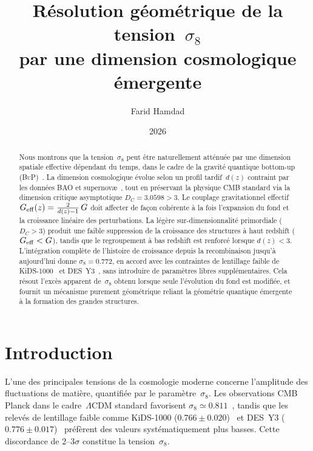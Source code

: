 \documentclass[11pt]{article}
\title{
  \textbf{Résolution géométrique de la tension~$\sigma_8$\\
  par une dimension cosmologique émergente}
}
\author{Farid Hamdad}
\affil{
  Cadre Bottom-Up Quantum Gravity (\BuP)\\
  \small\url{https://github.com/Farid-Hamdad/Bottom-up-Quantum-Gravity}
}
\date{2026}
\newcommand{\DC}{D_C}
\newcommand{\Geff}{G_{\rm eff}}
\newcommand{\sig}{\sigma_8}
\newcommand{\LCDM}{\Lambda\mathrm{CDM}}
\newcommand{\BuP}{\textsc{BuP}}
\begin{document}
\maketitle

\begin{abstract}
Nous montrons que la tension~$\sig$ peut être naturellement atténuée
par une dimension spatiale effective dépendant du temps, dans le cadre
de la gravité quantique bottom-up (\BuP)~\cite{hamdad2026bup}.
La dimension cosmologique évolue selon un profil tardif~$d(z)$
contraint par les données BAO et supernovæ~\cite{desi2024,pantheon},
tout en préservant la physique CMB standard via la dimension critique
asymptotique $\DC = 3.0598 > 3$.
Le couplage gravitationnel effectif
$\Geff(z) = \frac{2}{d(z)-1}\,G$
doit affecter de façon cohérente à la fois l'expansion du fond
et la croissance linéaire des perturbations.
La légère sur-dimensionnalité primordiale ($\DC > 3$) produit une
faible suppression de la croissance des structures à haut redshift
($\Geff < G$), tandis que le regroupement à bas redshift est renforcé
lorsque $d(z) < 3$.
L'intégration complète de l'histoire de croissance depuis la
recombinaison jusqu'à aujourd'hui donne
$\sig = 0.772$,
en accord avec les contraintes de lentillage faible de KiDS-1000~\cite{kids2021}
et DES~Y3~\cite{des2022}, sans introduire de paramètres libres
supplémentaires.
Cela résout l'excès apparent de~$\sig$ obtenu lorsque seule l'évolution
du fond est modifiée, et fournit un mécanisme purement géométrique reliant
la géométrie quantique émergente à la formation des grandes structures.
\end{abstract}

\section{Introduction}

L'une des principales tensions de la cosmologie moderne concerne
l'amplitude des fluctuations de matière, quantifiée par le
paramètre~$\sig$.
Les observations CMB Planck dans le cadre~$\LCDM$ standard
favorisent $\sig \simeq 0.811$~\cite{planck2018}, tandis que les
relevés de lentillage faible comme KiDS-1000
($0.766 \pm 0.020$)~\cite{kids2021} et DES~Y3
($0.776 \pm 0.017$)~\cite{des2022} préfèrent des valeurs
systématiquement plus basses.
Cette discordance de $2$--$3\sigma$ constitue la tension~$\sig$.
\end{document}
